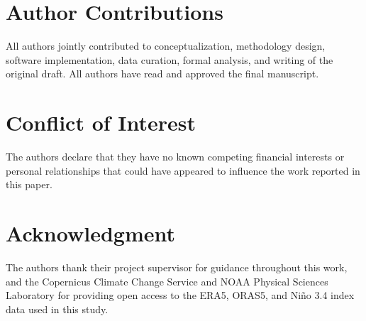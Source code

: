 \documentclass[conference]{IEEEtran}
\begin{document}
\section*{Author Contributions}
All authors jointly contributed to conceptualization, methodology design, software implementation, data curation, formal analysis, and writing of the original draft. All authors have read and approved the final manuscript.

\section*{Conflict of Interest}
The authors declare that they have no known competing financial interests or personal relationships that could have appeared to influence the work reported in this paper.

\section*{Acknowledgment}
The authors thank their project supervisor for guidance throughout this work, and the Copernicus Climate Change Service and NOAA Physical Sciences Laboratory for providing open access to the ERA5, ORAS5, and Ni\~no 3.4 index data used in this study.
\end{document}
